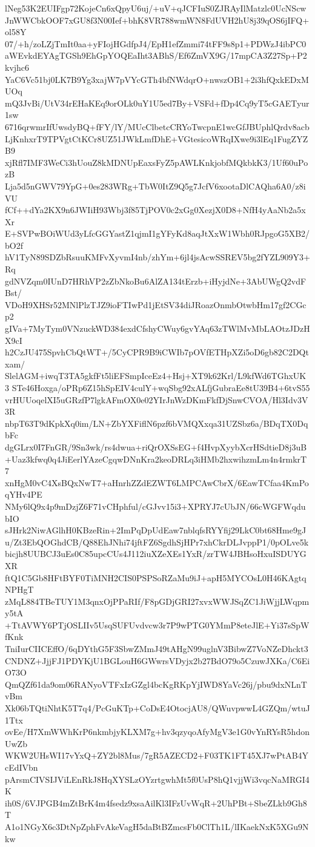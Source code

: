 lNeg53K2EUIFgp72KojeCn6xQpyU6uj/+uV+qJCFIuS0ZJRAyIlMatzlc0UcNScw
JnWWCbkOOF7xGU8f3N00Ief+bhK8VR788wmWN8FdUVH2hU8j39qOS6jIFQ+ol58Y
07/+h/zoLZjTmIt0aa+yFIojHGdfpJ4/EpH1efZmmi74tFF9s8p1+PDWzJ4ibPC0
aWEvkdEYAgTGSh9EhGpYOQEaIht3ABhS/Ef6ZmVX9G/17mpCA3Z27Sp+P2kvjhc6
YaC6Vc51bj0LK7B9Yg3xajW7pVYcGTh4bfNWdqrO+nwszOB1+2i3hfQxkEDxMUOq
mQ3JvBi/UtV34rEHaKEq9orOLk0uY1U5ed7By+VSFd+fDp4Cq9yT5cGAETyur1sw
6716qrwmrIfUwsdyBQ+fFY/lY/MUcClbetcCRYoTwcpnE1wcGfJBUphlQrdv8acb
LjKnhxrT9TPVgtCtKCr8UZ51JWkLmfDhE+VGtesicoWRqIXwe9i3lEq1FugZYZB9
xjRfl7IMF3WeCi3hUouZ8kMDNUpEaxsFyZ5pAWLKnkjobfMQkbkK3/1Uf60uPozB
Lja5d5nGWV79YpG+0es283WRg+TbW0ItZ9Q5g7JcfV6xootaDlCAQha6A0/z8iVU
fCf++dYa2KX9n6JWIiH93Wbj3f85TjPOV0c2xGg0XezjX0D8+NfH4yAaNb2a5xXr
E+SVPwBOiWUd3yLfcGGYastZ1qjmI1gYFyKd8aqJtXxW1Wbh0RJpgoG5XB2/bO2f
hV1TyN89SDZbRsuuKMFvXyvmI4nb/zhYm+6jl4jsAcwSSREV5bg2fYZL909Y3+Rq
gdNVZqm0IUnD7HRhVP2zZbNkoBu6AlZA134tErzb+iHyjdNe+3AbUWgQ2vdFBst/
VDoH9XHSr52MNlPlzTJZ9ioFTIwPd1jEtSV34diJRoazOnmbOtwbHm17gf2CGcp2
gIVa+7MyTym0VNzuckWD384exdCfshyCWuy6gvYAq63zTWlMvMbLAOtzJDzHX9cI
h2CzJU475SpvhCbQtWT+/5CyCPR9B9iCWIb7pOVfETHpXZi5oD6gb82C2DQtxam/
SlelAGM+iwqT3TA5gkfFt5liEFSmpIceEz4+Hsj+XT9k62Krl/L9kfWd6TGhxUK3
STe46Hoxga/oPRp6Z15hSpEIV4culY+wqSbg92xALfjGubraEe8tU39B4+6tvS55
vrHUUoqelXI5uGRzfP7lgkAFmOX0e02YIrJnWzDKmFkfDjSnwCVOA/Hl3Idv3V3R
nbpT63T9dKpkXq0im/LN+ZbYXFiflN6pzf6bVMQXxqa31UZSbz6a/BDqTX0DqbFc
dgGLrx0I7FnGR/9Sn3wk/rs4dwua+riQrOXSsEG+f4HvpXyybXcrHSdtieD8j3uB
+Uaz3kfwq0q4JiEerlYAzeCgqwDNnKra2keoDRLq3iHMb2hxwihzmLm4n4rmkrT7
xnHgM0vC4XsBQxNwT7+aHnrhZZdEZWT6LMPCAwCbrX/6EawTCfaa4KmPoqYHv4PE
NMy6lQ9x4p9mDzjZ6F71vCHphful/cGJvv15i3+XPRYJ7cUbJN/66cWGFWqdubIO
sJHrk2NiwAGlhH0KBzeRin+2ImPqDpUdEaw7nblqfsRYYfij29LkC0bt68Hme9gJ
u/Zt3EbQOGhdCB/Q88EhJNhi74jftFZ6SgdhSjHPr7xhCkrDLJvppP1/0pOLve5k
bicjh8UUBCJ3uEs0C85upcCUs4J112iuXZeXEs1YxR/zrTW4JBHsoHxuISDUYGXR
ftQ1C5Gb8HFtBYF0TiMNH2CIS0PSPSoRZaMu9iJ+apH5MYCOsL0H46KAgtqNPHgT
zMqL884TBeTUY1M3qnxOjPPaRIf/F8pGDjGRI27xvxWWJSqZC1JiWjjLWqpmy5tA
+TtAVWY6PTjOSLIIv5UsqSUFUvdvcw3r7P9wPTG0YMmP8eteJlE+Yi37sSpWfKnk
TniIurCIICEffO/6qDYthG5F3SbwZMmJ49tAHgN99uglnV3BibwZ7VoNZeDhckt3
CNDNZ+JjjFJ1PDYKjU1BGLouH6GWwrsVDyjx2b27BdO79o5CzuwJXKa/C6EiO73O
QmQZf61da9om06RANyoVTFxIzGZgl4bcKgRKpYjIWD8YaVc26j/pbu9dxNLnTvBm
Xk06bTQtiNhtK5T7q4/PcGuKTp+CoDsE4OtocjAU8/QWuvpwwL4GZQm/wtuJ1Ttx
ovEe/H7XmWWhKrP6nkmbjyKLXM7g+hv3qzyqoAfyMgV3e1G0vYnRYsR5hdonUwZb
WKW2UHsWI17vYxQ+ZY2bl8Mus/7gR5AZECD2+F03TK1FT45XJ7wPtAB4YcEdIVbn
pArsmCIVSIJViLEnRkJ8HqXYSLzOYzrtgwhMt5f0UsP8hQ1vjjWi3vqcNaMRGI4K
ih0S/6VJPGB4mZtBrK4m4fsedz9xsaAilKl3IFzUvWqR+2UhPBt+SbeZLkb9Gh8T
A1o1NGyX6c3DtNpZphFvAkeVagH5daBtBZmcsFb0ClTh1L/lIKaekNxK5XGu9Nkw
